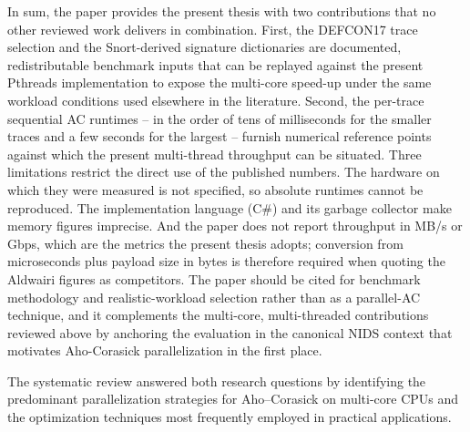 In sum, the paper provides the present thesis with two contributions that no other reviewed work delivers in combination. First, the DEFCON17 trace selection and the Snort-derived signature dictionaries are documented, redistributable benchmark inputs that can be replayed against the present Pthreads implementation to expose the multi-core speed-up under the same workload conditions used elsewhere in the literature. Second, the per-trace sequential AC runtimes -- in the order of tens of milliseconds for the smaller traces and a few seconds for the largest -- furnish numerical reference points against which the present multi-thread throughput can be situated. Three limitations restrict the direct use of the published numbers. The hardware on which they were measured is not specified, so absolute runtimes cannot be reproduced. The implementation language (C\#) and its garbage collector make memory figures imprecise. And the paper does not report throughput in MB/s or Gbps, which are the metrics the present thesis adopts; conversion from microseconds plus payload size in bytes is therefore required when quoting the Aldwairi figures as competitors. The paper should be cited for benchmark methodology and realistic-workload selection rather than as a parallel-AC technique, and it complements the multi-core, multi-threaded contributions reviewed above by anchoring the evaluation in the canonical NIDS context that motivates Aho-Corasick parallelization in the first place.


The systematic review answered both research questions by identifying the
predominant parallelization strategies for Aho--Corasick on multi-core CPUs and
the optimization techniques most frequently employed in practical applications.

